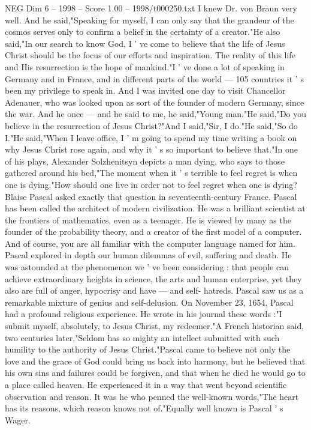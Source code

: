 \begin{textsample}{NEG Dim 6 – 1998 – Score 1.00 – 1998/t000250.txt}
I knew Dr. von Braun very well.
And he said,"Speaking for myself, I can only say that the grandeur of the cosmos serves only to confirm a belief in the certainty of a creator."He also said,"In our search to know God, I ' ve come to believe that the life of Jesus Christ should be the focus of our efforts and inspiration.
The reality of this life and His resurrection is the hope of mankind."I ' ve done a lot of speaking in Germany and in France, and in different parts of the world — 105 countries it ' s been my privilege to speak in.
And I was invited one day to visit Chancellor Adenauer, who was looked upon as sort of the founder of modern Germany, since the war.
And he once — and he said to me, he said,"Young man."He said,"Do you believe in the resurrection of Jesus Christ?"And I said,"Sir, I do."He said,"So do I."He said,"When I leave office, I ' m going to spend my time writing a book on why Jesus Christ rose again, and why it ' s so important to believe that."In one of his plays, Alexander Solzhenitsyn depicts a man dying, who says to those gathered around his bed,"The moment when it ' s terrible to feel regret is when one is dying."How should one live in order not to feel regret when one is dying?
Blaise Pascal asked exactly that question in seventeenth-century France.
Pascal has been called the architect of modern civilization.
He was a brilliant scientist at the frontiers of mathematics, even as a teenager.
He is viewed by many as the founder of the probability theory, and a creator of the first model of a computer.
And of course, you are all familiar with the computer language named for him.
Pascal explored in depth our human dilemmas of evil, suffering and death.
He was astounded at the phenomenon we ' ve been considering : that people can achieve extraordinary heights in science, the arts and human enterprise, yet they also are full of anger, hypocrisy and have — and self- hatreds.
Pascal saw us as a remarkable mixture of genius and self-delusion.
On November 23, 1654, Pascal had a profound religious experience.
He wrote in his journal these words :"I submit myself, absolutely, to Jesus Christ, my redeemer."A French historian said, two centuries later,"Seldom has so mighty an intellect submitted with such humility to the authority of Jesus Christ."Pascal came to believe not only the love and the grace of God could bring us back into harmony, but he believed that his own sins and failures could be forgiven, and that when he died he would go to a place called heaven.
He experienced it in a way that went beyond scientific observation and reason.
It was he who penned the well-known words,"The heart has its reasons, which reason knows not of."Equally well known is Pascal ' s Wager.

\end{textsample}
